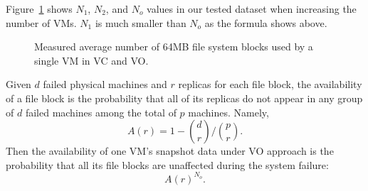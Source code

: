 Figure~\ref{fig:vm-links} shows $N_1$, $N_2$, and $N_o$ values in our tested dataset when increasing the number of VMs.  
$N_1$ is much smaller than $N_o$ as the formula shows above. 




\begin{figure}[htbp]
  \centering
  \caption{Measured average number of 64MB file system blocks used by a single VM in
VC and VO. }
  \label{fig:vm-links}
\end{figure}

Given $d$ failed physical machines and $r$ replicas for each file block,
the availability of a file block is the probability that  
all of its replicas do not appear in any group of $d$ failed machines among the total of $p$ machines. 
Namely, 
\[
A(r) = 1-\binom{d}{r}/ \binom{p}{r}. 
\]
Then the availability of one VM's snapshot data under VO approach is the probability that
 all its file blocks  are unaffected during the system failure:
\[
A(r)^{N_o}. 
\]

